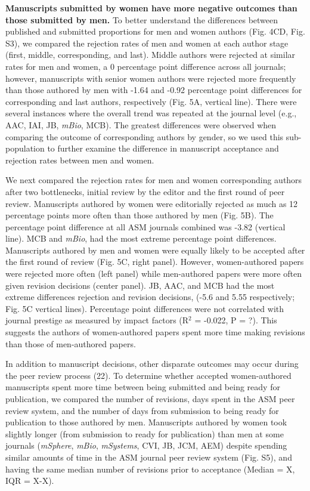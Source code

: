 \documentclass[11pt,]{article}
\begin{document}
\textbf{Manuscripts submitted by women have more negative outcomes than
those submitted by men.} To better understand the differences between
published and submitted proportions for men and women authors (Fig. 4CD,
Fig. S3), we compared the rejection rates of men and women at each
author stage (first, middle, corresponding, and last). Middle authors
were rejected at similar rates for men and women, a 0 percentage point
difference across all journals; however, manuscripts with senior women
authors were rejected more frequently than those authored by men with
-1.64 and -0.92 percentage point differences for corresponding and last
authors, respectively (Fig. 5A, vertical line). There were several
instances where the overall trend was repeated at the journal level
(e.g., AAC, IAI, JB, \emph{mBio}, MCB). The greatest differences were
observed when comparing the outcome of corresponding authors by gender,
so we used this sub-population to further examine the difference in
manuscript acceptance and rejection rates between men and women.

We next compared the rejection rates for men and women corresponding
authors after two bottlenecks, initial review by the editor and the
first round of peer review. Manuscripts authored by women were
editorially rejected as much as 12 percentage points more often than
those authored by men (Fig. 5B). The percentage point difference at all
ASM journals combined was -3.82 (vertical line). MCB and \emph{mBio},
had the most extreme percentage point differences. Manuscripts authored
by men and women were equally likely to be accepted after the first
round of review (Fig. 5C, right panel). However, women-authored papers
were rejected more often (left panel) while men-authored papers were
more often given revision decisions (center panel). JB, AAC, and MCB had
the most extreme differences rejection and revision decisions, (-5.6 and
5.55 respectively; Fig. 5C vertical lines). Percentage point differences
were not correlated with journal prestige as measured by impact factors
(R\({^2}\) = -0.022, P = ?). This suggests the authors of women-authored
papers spent more time making revisions than those of men-authored
papers.

In addition to manuscript decisions, other disparate outcomes may occur
during the peer review process (22). To determine whether accepted
women-authored manuscripts spent more time between being submitted and
being ready for publication, we compared the number of revisions, days
spent in the ASM peer review system, and the number of days from
submission to being ready for publication to those authored by men.
Manuscripts authored by women took slightly longer (from submission to
ready for publication) than men at some journals (\emph{mSphere},
\emph{mBio}, \emph{mSystems}, CVI, JB, JCM, AEM) despite spending
similar amounts of time in the ASM journal peer review system (Fig. S5),
and having the same median number of revisions prior to acceptance
(Median = X, IQR = X-X).
\end{document}
